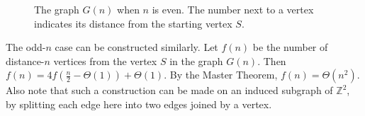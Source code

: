 \documentclass[11pt]{amsart}
\theoremstyle{definition}
\theoremstyle{remark}
\begin{document}
\begin{figure}[!htbp]
{
}
\caption{The graph $G(n)$ when $n$ is even. The number next to a vertex indicates its distance from the starting vertex $S$. }
\label{quad-boundary-grid}
\end{figure}

The odd-$n$ case can be constructed similarly. 
Let $f(n)$ be the number of distance-$n$ vertices from the vertex $S$ in the graph $G(n)$. 
Then $f(n)=4f(\frac{n}{2}-\Theta(1))+\Theta(1)$.
By the Master Theorem, $f(n)=\Theta(n^2)$. 
Also note that such a construction can be made on an induced subgraph of $\mathbb{Z}^2$, by splitting each edge here into two edges joined by a vertex. 
\end{document}
